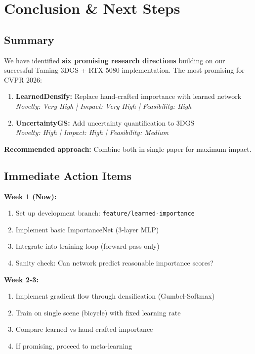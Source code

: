 \documentclass[11pt,letterpaper]{article}
\begin{document}
\section{Conclusion \& Next Steps}

\subsection{Summary}

We have identified \textbf{six promising research directions} building on our successful Taming 3DGS + RTX 5080 implementation. The most promising for CVPR 2026:

\begin{enumerate}[leftmargin=*]
    \item \textbf{LearnedDensify:} Replace hand-crafted importance with learned network \\
    \textit{Novelty: Very High | Impact: Very High | Feasibility: High}

    \item \textbf{UncertaintyGS:} Add uncertainty quantification to 3DGS \\
    \textit{Novelty: High | Impact: High | Feasibility: Medium}
\end{enumerate}

\textbf{Recommended approach:} Combine both in single paper for maximum impact.

\subsection{Immediate Action Items}

\textbf{Week 1 (Now):}
\begin{enumerate}[leftmargin=*]
    \item Set up development branch: \texttt{feature/learned-importance}
    \item Implement basic ImportanceNet (3-layer MLP)
    \item Integrate into training loop (forward pass only)
    \item Sanity check: Can network predict reasonable importance scores?
\end{enumerate}

\textbf{Week 2-3:}
\begin{enumerate}[leftmargin=*]
    \item Implement gradient flow through densification (Gumbel-Softmax)
    \item Train on single scene (bicycle) with fixed learning rate
    \item Compare learned vs hand-crafted importance
    \item If promising, proceed to meta-learning
\end{enumerate}
\end{document}
